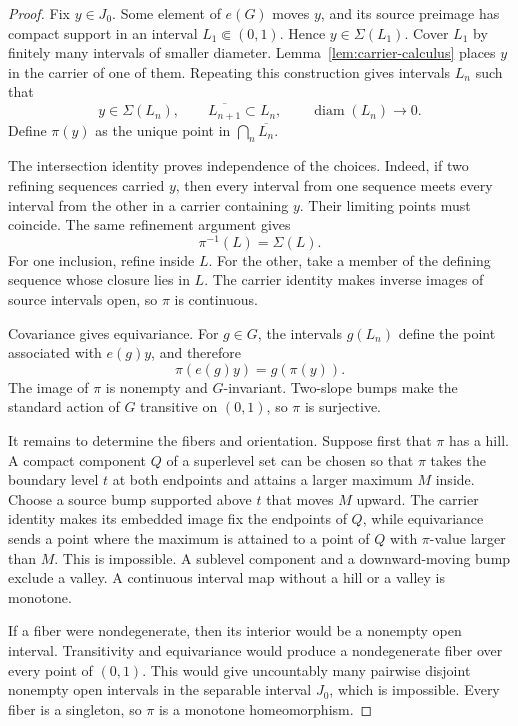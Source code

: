 \documentclass[11pt]{amsart}
\theoremstyle{definition}
\theoremstyle{remark}
\numberwithin{equation}{section}
\begin{document}
\begin{proof}
Fix \(y\in J_0\). Some element of \(e(G)\) moves \(y\), and its source preimage has compact support in an interval \(L_1\Subset(0,1)\). Hence \(y\in\Sigma(L_1)\). Cover \(L_1\) by finitely many intervals of smaller diameter. Lemma~\ref{lem:carrier-calculus} places \(y\) in the carrier of one of them. Repeating this construction gives intervals \(L_n\) such that
\[
y\in\Sigma(L_n),\qquad
\overline{L_{n+1}}\subset L_n,
\qquad
\operatorname{diam}(L_n)\longrightarrow0.
\]
Define \(\pi(y)\) as the unique point in \(\bigcap_n\overline{L_n}\).

The intersection identity proves independence of the choices. Indeed, if two refining sequences carried \(y\), then every interval from one sequence meets every interval from the other in a carrier containing \(y\). Their limiting points must coincide. The same refinement argument gives
\[
\pi^{-1}(L)=\Sigma(L).
\]
For one inclusion, refine inside \(L\). For the other, take a member of the defining sequence whose closure lies in \(L\). The carrier identity makes inverse images of source intervals open, so \(\pi\) is continuous.

Covariance gives equivariance. For \(g\in G\), the intervals \(g(L_n)\) define the point associated with \(e(g)y\), and therefore
\[
\pi(e(g)y)=g(\pi(y)).
\]
The image of \(\pi\) is nonempty and \(G\)-invariant. Two-slope bumps make the standard action of \(G\) transitive on \((0,1)\), so \(\pi\) is surjective.

It remains to determine the fibers and orientation. Suppose first that \(\pi\) has a hill. A compact component \(Q\) of a superlevel set can be chosen so that \(\pi\) takes the boundary level \(t\) at both endpoints and attains a larger maximum \(M\) inside. Choose a source bump supported above \(t\) that moves \(M\) upward. The carrier identity makes its embedded image fix the endpoints of \(Q\), while equivariance sends a point where the maximum is attained to a point of \(Q\) with \(\pi\)-value larger than \(M\). This is impossible. A sublevel component and a downward-moving bump exclude a valley. A continuous interval map without a hill or a valley is monotone.

If a fiber were nondegenerate, then its interior would be a nonempty open interval. Transitivity and equivariance would produce a nondegenerate fiber over every point of \((0,1)\). This would give uncountably many pairwise disjoint nonempty open intervals in the separable interval \(J_0\), which is impossible. Every fiber is a singleton, so \(\pi\) is a monotone homeomorphism.


\end{proof}
\end{document}

